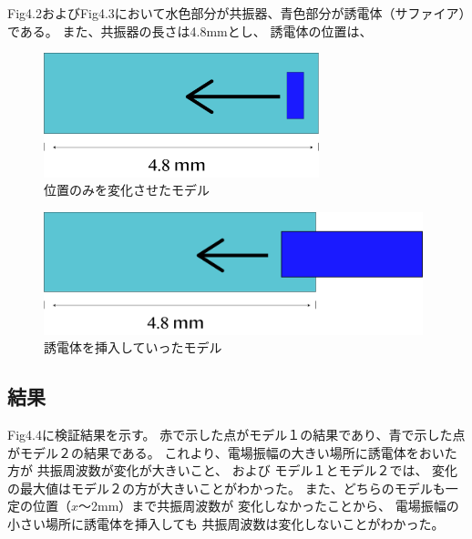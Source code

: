 Fig4.2およびFig4.3において水色部分が共振器、青色部分が誘電体（サファイア）である。
また、共振器の長さは4.8mmとし、
誘電体の位置は、

\vspace{10 mm}

\begin{figure}[h]
  \begin{center}
    \includegraphics[width=8cm]{./image/pos.png}
    \caption{位置のみを変化させたモデル}
    \label{fig:potition}
  \end{center}
\end{figure}

\vspace{10 mm}

\begin{figure}[h]
  \begin{center}
    \includegraphics[width=11cm]{./image/length.png}
    \caption{誘電体を挿入していったモデル}
    \label{fig:length}
  \end{center}
\end{figure}

\subsection*{結果}
Fig4.4に検証結果を示す。
赤で示した点がモデル１の結果であり、青で示した点がモデル２の結果である。
これより、電場振幅の大きい場所に誘電体をおいた方が
共振周波数が変化が大きいこと、
および
モデル１とモデル２では、
変化の最大値はモデル２の方が大きいことがわかった。
また、どちらのモデルも一定の位置（$x$〜2mm）まで共振周波数が
変化しなかったことから、
電場振幅の小さい場所に誘電体を挿入しても
共振周波数は変化しないことがわかった。


